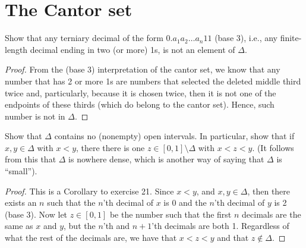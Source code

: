 \section{The Cantor set}


\begin{exercise}{21}
Show that any terniary decimal of the form $0.a_1a_2\dots a_n11$ (base 3), i.e., any finite-length decimal ending in two (or more) 1s, is not an element of $\Delta$.
\end{exercise}
\begin{proof}
From the (base 3) interpretation of the cantor set, we know that any number that has 2 or more 1s are numbers that selected the deleted middle third twice and, particularly, because it is chosen twice, then it is not one of the endpoints of these thirds (which do belong to the cantor set). Hence, such number is not in $\Delta$.
\end{proof} 

\begin{exercise}{22}
Show that $\Delta$ contains no (nonempty) open intervals. In particular, show that if $x,y\in\Delta$ with $x<y$, there there is one $z\in[0,1]\setminus\Delta$ with $x<z<y$. (It follows from this that $\Delta$ is nowhere dense, which is another way of saying that $\Delta$ is ``small'').
\end{exercise}
\begin{proof}
This is a Corollary to exercise 21. Since $x<y$, and $x,y\in\Delta$, then there exists an $n$ such that the $n$'th decimal of $x$ is 0 and the $n$'th decimal of $y$ is 2 (base 3). Now let $z\in[0,1]$ be the number such that the first $n$ decimals are the same as $x$ and $y$, but the $n$'th and $n+1$'th decimals are both 1. Regardless of what the rest of the decimals are, we have that $x<z<y$ and that $z\notin\Delta$.
\end{proof} 

